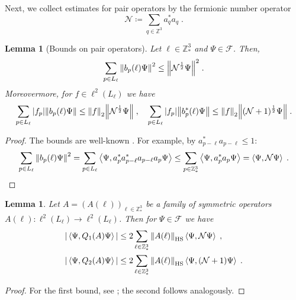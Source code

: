 \documentclass[12pt,a4paper]{article}
\numberwithin{equation}{section}
\newcommand{\cF}{\mathcal{F}}
\newcommand{\cN}{\mathcal{N}}
\newcommand{\1}{\mathbb{I}}
\newcommand{\HS}{\mathrm{HS}}
\newcommand{\Z}{\mathbb{Z}}
\newcommand{\NN}{\mathcal{N}}
\newcommand{\half}{\frac{1}{2}}
\newcommand{\eva}[1]{\left\langle #1 \right\rangle}
\theoremstyle{plain}
\newtheorem{lemma}[theorem]{Lemma}
\theoremstyle{definition}
\theoremstyle{remark}
\theoremstyle{plain}
\theoremstyle{definition}
\theoremstyle{remark}
\begin{document}
Next, we collect estimates for pair operators by the fermionic number operator
\begin{equation} \label{eq:cN}
	\cN \coloneq \sum_{q \in \Z^3} a_q^* a_q \;.
\end{equation}

\begin{lemma}[Bounds on pair operators]\label{lem:pairest}
Let $\ell \in \Z^3_*$ and $ \Psi \in \cF $. Then,
\begin{equation}\label{eq:estopb}
	\sum_{p \in L_\ell}\norm{b_p(\ell)\Psi}^2
	\leq \norm{\NN^\half \Psi}^2  \;.
\end{equation}
Moreovermore, for $f \in \ell^2(L_\ell)$ we have
\begin{equation} \label{eq:estb}
	\sum_{p\in L_\ell} |f_p| \norm{b_p(\ell) \Psi}
	\leq \norm{f}_2 \norm{\NN^\half\Psi} \;, \quad
	\sum_{p\in L_\ell} |f_p| \norm{b^*_p(\ell) \Psi}
	\leq \norm{f}_2 \norm{(\NN+1)^\half\Psi} \;.
\end{equation}
\end{lemma}
\begin{proof}
The bounds are well-known \cite[Prop.~4.2]{CHN21}. For example, by $a^*_{p-\ell}a_{p-\ell} \leq 1$:
\[
	\sum_{p \in L_\ell}\norm{b_p(\ell)\Psi}^2
	= \sum_{p \in L_\ell} \eva{\Psi,a^*_{p} a^*_{p-\ell}a_{p-\ell} a_{p}\Psi}
	\leq \sum_{p \in \Z^3_*} \eva{\Psi, a^*_{p} a_{p}\Psi}
	= \eva{\Psi, \NN \Psi} \;. \qedhere
\]
\end{proof}


\begin{lemma}\label{lem:estQ2}
Let $A = (A(\ell))_{\ell \in \Z^3_*}$ be a family of symmetric operators $ A(\ell) : \ell^2(L_\ell) \to \ell^2(L_\ell) $. Then for $ \Psi \in \cF $ we have
\begin{equation} \label{eq:Qest}
\begin{aligned}
	|\eva{\Psi,Q_1(A)\Psi}|
	&\leq 2\sum_{\ell\in \Z^3_*}\norm{A(\ell)}_{\HS}\eva{\Psi,\mathcal{N} \Psi} \;, \\
	|\eva{\Psi,Q_2(A)\Psi}|
	&\leq 2\sum_{\ell\in \Z^3_*}\norm{A(\ell)}_{\HS}\eva{\Psi,(\mathcal{N}+1) \Psi} \;.
\end{aligned}
\end{equation}
\end{lemma}

\begin{proof}
For the first bound, see \cite[Prop.~4.7]{CHN21}; the second follows analogously.
\end{proof}
\end{document}
